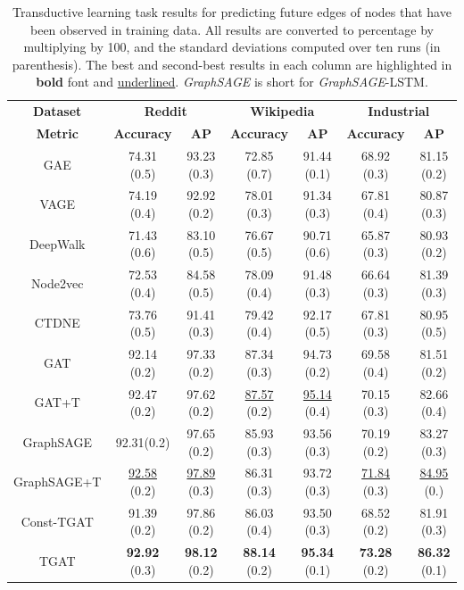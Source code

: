 \documentclass{article} %
\begin{document}
\begin{table}[]
\small
    \centering
    \begin{tabular}{c|c c| c c| c c }
    \hline
    \hline
         \textbf{Dataset} & \multicolumn{2}{c}{\textbf{Reddit}} & \multicolumn{2}{c}{\textbf{Wikipedia}} & \multicolumn{2}{c}{\textbf{Industrial}} \\ 
        
        \textbf{Metric} & \textbf{Accuracy} & \textbf{AP} &  \textbf{Accuracy} & \textbf{AP} &  \textbf{Accuracy} & \textbf{AP}\\
        
        \hline
        GAE & 74.31 (0.5) & 93.23 (0.3) & 72.85 (0.7) & 91.44 (0.1) & 68.92 (0.3) & 81.15 (0.2)  \\ 
        VAGE & 74.19 (0.4) & 92.92 (0.2) & 78.01 (0.3) & 91.34 (0.3) & 67.81 (0.4) & 80.87 (0.3) \\ 
        DeepWalk & 71.43 (0.6) & 83.10 (0.5) & 76.67 (0.5) & 90.71 (0.6) & 65.87 (0.3) & 80.93 (0.2)\\ 
        Node2vec & 72.53 (0.4) & 84.58 (0.5)  & 78.09 (0.4) & 91.48 (0.3) & 66.64 (0.3) & 81.39 (0.3) \\ 
        CTDNE & 73.76 (0.5) & 91.41 (0.3) & 79.42 (0.4) & 92.17 (0.5) & 67.81 (0.3) & 80.95 (0.5) \\ 
        GAT & 92.14 (0.2) & 97.33 (0.2) & 87.34 (0.3) & 94.73 (0.2) & 69.58 (0.4) & 81.51 (0.2) \\ 
        {GAT+T} & 92.47 (0.2)   & 97.62 (0.2)  & \underline{87.57} (0.2)  & \underline{95.14} (0.4)  & 70.15 (0.3)  & 82.66 (0.4)  \\
        GraphSAGE & 92.31(0.2) & 97.65 (0.2) & 85.93 (0.3) & 93.56 (0.3) & 70.19 (0.2) & 83.27 (0.3) \\ 
        {GraphSAGE+T} &   \underline{92.58} (0.2) &  \underline{97.89} (0.3) & {86.31} (0.3)  & {93.72} (0.3)  & \underline{71.84} (0.3)  &  \underline{84.95} (0.) \\ \hline
        Const-TGAT & 91.39 (0.2) & 97.86 (0.2) & 86.03 (0.4) & 93.50 (0.3) & 68.52 (0.2) & 81.91 (0.3) \\ 
        TGAT & \textbf{92.92} (0.3) & \textbf{98.12} (0.2) & \textbf{88.14} (0.2) & \textbf{95.34} (0.1) & \textbf{73.28} (0.2) & \textbf{86.32} (0.1) \\ 
        \hline
        \hline
    \end{tabular}
    \caption{Transductive learning task results for predicting future edges of nodes that have been observed in training data. All results are converted to percentage by multiplying by 100, and the standard deviations computed over ten runs (in parenthesis). The best and second-best results in each column are highlighted in \textbf{bold} font and \underline{underlined}. \textsl{GraphSAGE} is short for \textsl{GraphSAGE}-LSTM.}
    \label{tab:seen_node_edge_pred}
\end{table}
\end{document}
